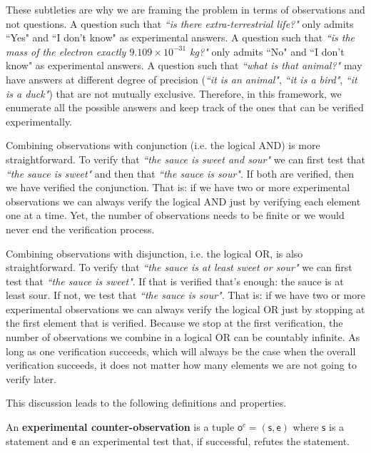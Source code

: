 \documentclass[11pt,letterpaper,fleqn]{memoir} %
\begin{document}
These subtleties are why we are framing the problem in terms of observations and not questions. A question such that \emph{``is there extra-terrestrial life?"} only admits ``Yes" and ``I don't know" as experimental answers. A question such that \emph{``is the mass of the electron exactly $9.109 \times 10^{-31}$ kg?"} only admits ``No" and ``I don't know" as experimental answers. A question such that \emph{``what is that animal?"} may have answers at different degree of precision (\emph{``it is an animal"}, \emph{``it is a bird"}, \emph{``it is a duck"}) that are not mutually exclusive. Therefore, in this framework, we enumerate all the possible answers and keep track of the ones that can be verified experimentally.

Combining observations with conjunction (i.e. the logical AND) is more straightforward. To verify that \emph{``the sauce is sweet and sour"} we can first test that \emph{``the sauce is sweet"} and then that \emph{``the sauce is sour"}. If both are verified, then we have verified the conjunction. That is: if we have two or more experimental observations we can always verify the logical AND just by verifying each element one at a time. Yet, the number of observations needs to be finite or we would never end the verification process.

Combining observations with disjunction, i.e. the logical OR, is also straightforward. To verify that \emph{``the sauce is at least sweet or sour"} we can first test that \emph{``the sauce is sweet"}. If that is verified that's enough: the sauce is at least sour. If not, we test that \emph{``the sauce is sour"}. That is: if we have two or more experimental observations we can always verify the logical OR just by stopping at the first element that is verified. Because we stop at the first verification, the number of observations we combine in a logical OR can be countably infinite. As long as one verification succeeds, which will always be the case when the overall verification succeeds, it does not matter how many elements we are not going to verify later.

This discussion leads to the following definitions and properties.

\begin{defn}
	An \textbf{experimental counter-observation} is a tuple $\mathsf{o}^c=(\mathsf{s}, \mathsf{e})$ where $\mathsf{s}$ is a statement and $\mathsf{e}$ an experimental test that, if successful, refutes the statement.
\end{defn}
\end{document}
